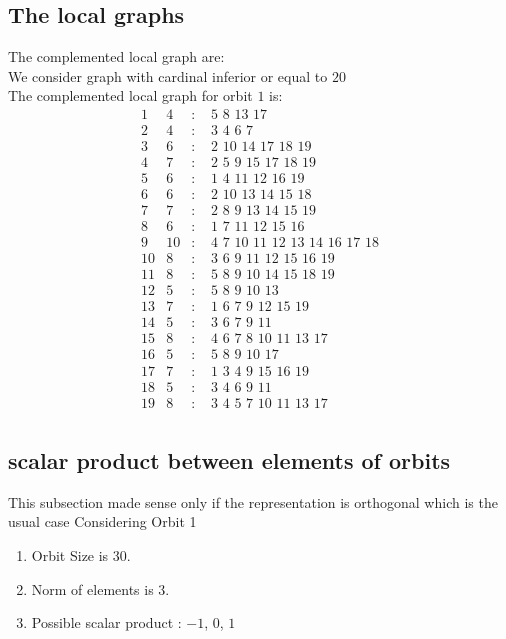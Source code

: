 \documentclass[12pt]{article}
\begin{document}
\subsection{The local graphs}
The complemented local graph are:\\
We consider graph with cardinal inferior or equal to $20$\\
The complemented local graph for orbit $1$ is:
\begin{equation*}
\begin{array}{rrcl}
1&4&:&\,\,5\,\,8\,\,13\,\,17\\
2&4&:&\,\,3\,\,4\,\,6\,\,7\\
3&6&:&\,\,2\,\,10\,\,14\,\,17\,\,18\,\,19\\
4&7&:&\,\,2\,\,5\,\,9\,\,15\,\,17\,\,18\,\,19\\
5&6&:&\,\,1\,\,4\,\,11\,\,12\,\,16\,\,19\\
6&6&:&\,\,2\,\,10\,\,13\,\,14\,\,15\,\,18\\
7&7&:&\,\,2\,\,8\,\,9\,\,13\,\,14\,\,15\,\,19\\
8&6&:&\,\,1\,\,7\,\,11\,\,12\,\,15\,\,16\\
9&10&:&\,\,4\,\,7\,\,10\,\,11\,\,12\,\,13\,\,14\,\,16\,\,17\,\,18\\
10&8&:&\,\,3\,\,6\,\,9\,\,11\,\,12\,\,15\,\,16\,\,19\\
11&8&:&\,\,5\,\,8\,\,9\,\,10\,\,14\,\,15\,\,18\,\,19\\
12&5&:&\,\,5\,\,8\,\,9\,\,10\,\,13\\
13&7&:&\,\,1\,\,6\,\,7\,\,9\,\,12\,\,15\,\,19\\
14&5&:&\,\,3\,\,6\,\,7\,\,9\,\,11\\
15&8&:&\,\,4\,\,6\,\,7\,\,8\,\,10\,\,11\,\,13\,\,17\\
16&5&:&\,\,5\,\,8\,\,9\,\,10\,\,17\\
17&7&:&\,\,1\,\,3\,\,4\,\,9\,\,15\,\,16\,\,19\\
18&5&:&\,\,3\,\,4\,\,6\,\,9\,\,11\\
19&8&:&\,\,3\,\,4\,\,5\,\,7\,\,10\,\,11\,\,13\,\,17\\
\end{array}
\end{equation*}
\subsection{scalar product between elements of orbits}
\noindent This subsection made sense only if the representation is orthogonal which is the usual case
Considering Orbit 1
\begin{enumerate}
\item Orbit Size is $30$.
\item Norm of elements is $3$.
\item Possible scalar product : $-1$, $0$, $1$
\end{enumerate}
\end{document}
